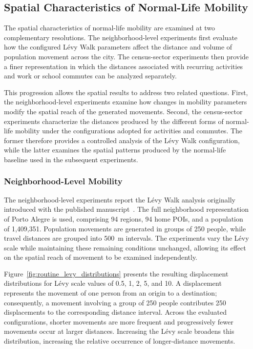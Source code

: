 \subsection{Spatial Characteristics of Normal-Life Mobility}
\label{sec:result_spatial_normal_life}

The spatial characteristics of normal-life mobility are examined at two complementary resolutions. The neighborhood-level experiments first evaluate how the configured Lévy Walk parameters affect the distance and volume of population movement across the city. The census-sector experiments then provide a finer representation in which the distances associated with recurring activities and work or school commutes can be analyzed separately.

This progression allows the spatial results to address two related questions. First, the neighborhood-level experiments examine how changes in mobility parameters modify the spatial reach of the generated movements. Second, the census-sector experiments characterize the distances produced by the different forms of normal-life mobility under the configurations adopted for activities and commutes. The former therefore provides a controlled analysis of the Lévy Walk configuration, while the latter examines the spatial patterns produced by the normal-life baseline used in the subsequent experiments.

\subsubsection{Neighborhood-Level Mobility}
\label{sec:routine_mobility_neighborhood}

The neighborhood-level experiments report the Lévy Walk analysis originally introduced with the published manuscript~\cite{silva2026lodusPop}. The full neighborhood representation of Porto Alegre is used, comprising 94 regions, 94 home POIs, and a population of 1,409,351. Population movements are generated in groups of 250 people, while travel distances are grouped into 500~m intervals. The experiments vary the Lévy scale while maintaining these remaining conditions unchanged, allowing its effect on the spatial reach of movement to be examined independently.

Figure~\ref{fig:routine_levy_distributions} presents the resulting displacement distributions for Lévy scale values of 0.5, 1, 2, 5, and 10. A displacement represents the movement of one person from an origin to a destination; consequently, a movement involving a group of 250 people contributes 250 displacements to the corresponding distance interval. Across the evaluated configurations, shorter movements are more frequent and progressively fewer movements occur at larger distances. Increasing the Lévy scale broadens this distribution, increasing the relative occurrence of longer-distance movements.

